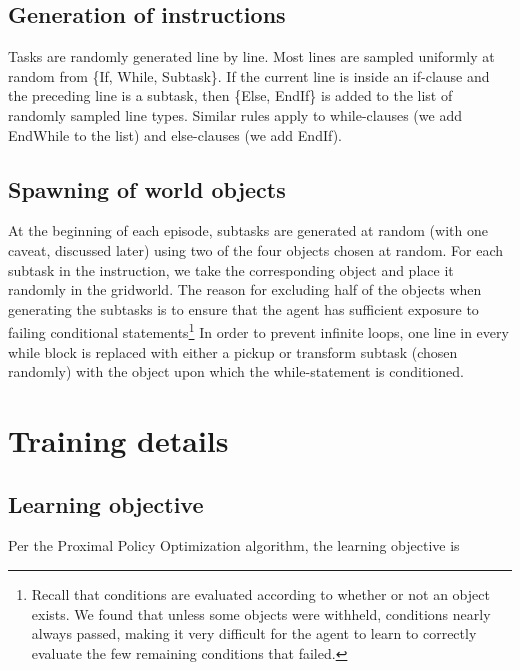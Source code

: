 \documentclass{article}
\begin{document}
\subsection{Generation of instructions}
Tasks are randomly generated line by line. Most lines are sampled uniformly at
random from \{If, While, Subtask\}. If the current line is inside an if-clause and
the preceding line is a subtask, then \{Else, EndIf\} is added to the list of
randomly sampled line types. Similar rules apply to while-clauses (we add
EndWhile to the list) and else-clauses (we add EndIf). 


\subsection{Spawning of world objects}
At the beginning of each episode, subtasks are generated at random (with one caveat, discussed later) using two of the four objects  chosen at random. 
For each subtask in the instruction, we take the corresponding object and place
it randomly in the gridworld. The reason for excluding half of the objects when
generating the subtasks is to ensure that the agent has sufficient exposure to
failing conditional statements\footnote{Recall that conditions are evaluated
according to whether or not an object exists. We found that unless some objects
were withheld, conditions nearly always passed, making it very difficult for the agent to learn to correctly evaluate the few remaining conditions that failed.} In order to prevent infinite loops, one line in every while block is replaced with either a pickup or transform subtask (chosen randomly) with the object upon which the while-statement is conditioned. 


\section{Training details}
\label{training}
\subsection{Learning objective}
Per the Proximal Policy Optimization algorithm, the learning objective is
\end{document}
